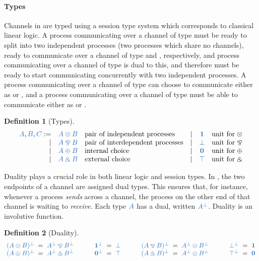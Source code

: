 \documentclass[draft,submission,copyright,creativecommons]{eptcs}
\newtheorem{definition}{Definition}
\begin{document}
\paragraph{Types}
Channels in \cp are typed using a session type system which corresponds to classical linear logic. A process communicating over a channel of type  must be ready to split into two independent processes (two processes which share no channels), ready to communicate over a channel of type  and , respectively, and process communicating over a channel of type  is dual to this, and therefore must be ready to start communicating concurrently with two independent processes. A process communicating over a channel of type  can choose to communicate either as  or , and a process communicating over a channel of type  must be able to communicate either as  or .
\begin{definition}[Types]\label{def:cp-types}
  \[
    \begin{array}{rclrcl}
      \ty{A}, \ty{B}, \ty{C}
           :=& \ty{A \tens B} &\text{pair of independent processes}
      &  \mid& \ty{\one}      &\text{unit for} \; {\tens}
      \\ \mid& \ty{A \parr B} &\text{pair of interdependent processes}
      &  \mid& \ty{\bot}      &\text{unit for} \; {\parr}
      \\ \mid& \ty{A \plus B} &\text{internal choice}
      &  \mid& \ty{\nil}      &\text{unit for} \; {\plus}
      \\ \mid& \ty{A \with B} &\text{external choice}
      &  \mid& \ty{\top}      &\text{unit for} \; {\with}
    \end{array}
  \]
\end{definition}\noindent
Duality plays a crucial role in both linear logic and session types. In \cp, the two endpoints of a channel are assigned dual types. This ensures that, for instance, whenever a process \emph{sends} across a channel, the process on the other end of that channel is waiting to \emph{receive}. Each type $\ty{A}$ has a dual, written $\ty{A^\bot}$. Duality is an involutive function.
\begin{definition}[Duality]\label{def:cp-negation}
  \[
    \setlength{\arraycolsep}{3pt}
    \begin{array}{lclclclclclclcl}
               \ty{(A \tens B)^\bot} & = & \ty{A^\bot \parr B^\bot}
      &\qquad& \ty{\one^\bot}        & = & \ty{\bot}
      &\qquad& \ty{(A \parr B)^\bot} & = & \ty{A^\bot \tens B^\bot}
      &\qquad& \ty{\bot^\bot}        & = & \ty{\one}
      \\       \ty{(A \plus B)^\bot} & = & \ty{A^\bot \with B^\bot}
      &\qquad& \ty{\nil^\bot}        & = & \ty{\top}
      &\qquad& \ty{(A \with B)^\bot} & = & \ty{A^\bot \plus B^\bot}
      &\qquad& \ty{\top^\bot}        & = & \ty{\nil}
    \end{array}
  \]
\end{definition}\noindent
\end{document}
